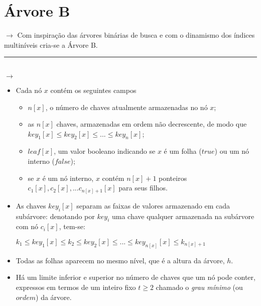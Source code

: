 \documentclass[a4paper, 12pt]{article}
\begin{document}
\section{Árvore B}

\textcolor{white}{               }

$\rightarrow$ Com inspiração das árvores binárias de busca e com o dinamismo dos índices multiníveis cria-se a Árvore B.\\

\rule{12cm}{0.4pt}\\

$\rightarrow$   
\begin{itemize}
\item {} Cada nó $x$ contém os seguintes campos

\begin{itemize}
\item $n[x]$, o número de chaves atualmente armazenadas no nó $x$;
\item as $n[x]$ chaves, armazenadas em ordem não decrescente, de modo que $key_{1}[x] \leq key_{2}[x] \leq ... \leq key_{n}[x]$;
\item $leaf[x]$, um valor booleano indicando se $x$ é um folha ($true$) ou um nó interno ($false$);
\item se $x$ é um nó interno, $x$ contém $n[x] + 1$ ponteiros $c_{1}[x], c_{2}[x], ... c_{n[x]+1}[x]$ para seus filhos.
\end{itemize}


\item {} As chaves  $key_{i}[x]$ separam as faixas de valores armazenado em cada subárvore: denotando por $key_{i}$ uma chave qualquer armazenada na subárvore com nó $c_{i}[x]$, tem-se:

\begin{center}
$k_{1} \leq key_{1}[x] \leq k_{2} \leq key_{2}[x] \leq ... \leq key_{n[x]}[x] \leq k_{n[x]+1}$
\end{center}



\item {} Todas as folhas aparecem no mesmo nível, que é a altura da árvore, $h$.

\item {} Há um limite inferior e superior no número de chaves que um nó pode conter, expressos em termos de um inteiro fixo ${t \geq 2}$ chamado o \textit{grau mínimo} (ou $ordem$) da árvore.


\end{itemize}
\end{document}
